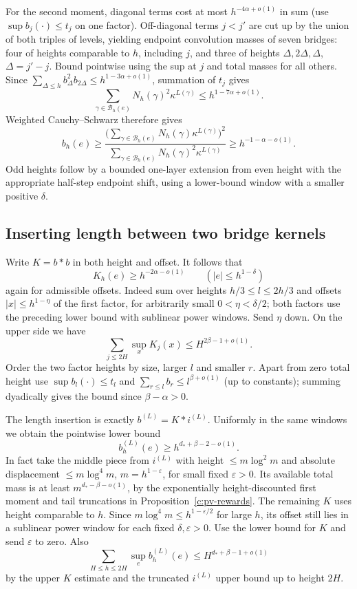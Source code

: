 For the second moment, diagonal terms cost at most \(h^{-4\alpha+o(1)}\) in sum (use \(\sup b_j(\cdot)\le t_j\) on one factor). Off-diagonal terms \(j<j'\) are cut up by the union of both triples of levels, yielding endpoint convolution masses of seven bridges: four of heights comparable to \(h\), including \(j\), and three of heights \(\Delta,2\Delta,\Delta\), \(\Delta=j'-j\). Bound pointwise using the sup at \(j\) and total masses for all others. Since \(\sum_{\Delta\le h}b_\Delta^2 b_{2\Delta}\le h^{1-3\alpha+o(1)}\), summation of \(t_j\) gives
\[
 \sum_{\gamma\in\mathcal B_h(e)}N_h(\gamma)^2\kappa^{L(\gamma)}
 \le h^{1-7\alpha+o(1)}.
\]
Weighted Cauchy--Schwarz therefore gives
\[
 b_h(e)\ge
 \frac{\bigl(\sum_{\gamma\in\mathcal B_h(e)}
 N_h(\gamma)\kappa^{L(\gamma)}\bigr)^2}
 {\sum_{\gamma\in\mathcal B_h(e)}
 N_h(\gamma)^2\kappa^{L(\gamma)}}
 \ge h^{-1-\alpha-o(1)}.
\]
Odd heights follow by a bounded one-layer extension from even height
with the appropriate half-step endpoint shift, using a lower-bound
window with a smaller positive \(\delta\).

\subsection{Inserting length between two bridge kernels}
Write \(K=b*b\) in both height and offset. It follows that
\[
 K_h(e)\ge h^{-2\alpha-o(1)} \qquad (|e|\le h^{1-\delta})
\]
again for admissible offsets. Indeed sum over heights \(h/3\le l\le 2h/3\) and offsets \(|x|\le h^{1-\eta}\) of the first factor, for arbitrarily small \(0<\eta<\delta/2\); both factors use the preceding lower bound with sublinear power windows. Send \(\eta\) down. On the upper side we have
\[
 \sum_{j\le 2H}\sup_x K_j(x)\le H^{2\beta-1+o(1)} .
\]
Order the two factor heights by size, larger \(l\) and smaller \(r\). Apart from zero total height use \(\sup b_l(\cdot)\le t_l\) and \(\sum_{r\le l} b_r\le l^{\beta+o(1)}\) (up to constants); summing dyadically gives the bound since \(\beta-\alpha>0\).

The length insertion is exactly \(b^{(L)}=K*i^{(L)}\). Uniformly in the same windows we obtain the pointwise lower bound
\[
 b_h^{(L)}(e)\ge h^{d_*+\beta-2-o(1)}.
\]
In fact take the middle piece from \(i^{(L)}\) with height \(\le m\log^2 m\) and absolute displacement \(\le m\log^4 m\), \(m=h^{1-\varepsilon}\), for small fixed \(\varepsilon>0\). Its available total mass is at least \(m^{d_*-\beta-o(1)}\), by the exponentially height-discounted first moment and tail truncations in Proposition~\ref{c:pv-rewards}. The remaining \(K\) uses height comparable to \(h\). Since \(m\log^4m\le h^{1-\varepsilon/2}\) for large \(h\), its offset still lies in a sublinear power window for each fixed \(\delta,\varepsilon>0\). Use the lower bound for \(K\) and send \(\varepsilon\) to zero. Also
\[
 \sum_{H\le h\le 2H}\sup_e b_h^{(L)}(e)\le H^{d_*+\beta-1+o(1)}
\]
by the upper \(K\) estimate and the truncated \(i^{(L)}\) upper bound up to height \(2H\).

